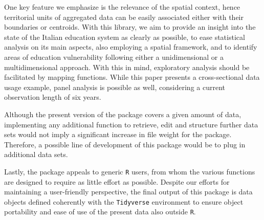 \documentclass{book}
\begin{document}
One key feature we emphasize is the relevance of the spatial context, hence territorial units of aggregated data can be easily associated either with their boundaries or centroids. With this library, we aim to provide an insight into the state of the Italian education system as clearly as possible, to ease statistical analysis on its main aspects, also employing a spatial framework, and to identify areas of education vulnerability following either a unidimensional or a multidimensional approach. With this in mind, exploratory analysis should be facilitated by mapping functions. While this paper presents a cross-sectional data usage example, panel analysis is possible as well, considering a current observation length of six years. 

Although the present version of the package covers a given amount of data, implementing any additional function to retrieve, edit and structure further data sets would not imply a significant increase in file weight for the package. Therefore, a possible line of development of this package would be to plug in additional data sets.

Lastly, the package appeals to generic \texttt{R} users, from whom the various functions are designed to require as little effort as possible. Despite our efforts for maintaining a user-friendly perspective, the final output of this package is data objects defined coherently with the \texttt{Tidyverse} environment to ensure object portability and ease of use of the present data also outside \texttt{R}.
\end{document}
